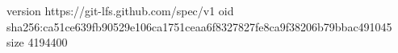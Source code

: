 version https://git-lfs.github.com/spec/v1
oid sha256:ca51ce639fb90529e106ca1751ceaa6f8327827fe8ca9f38206b79bbac491045
size 4194400
